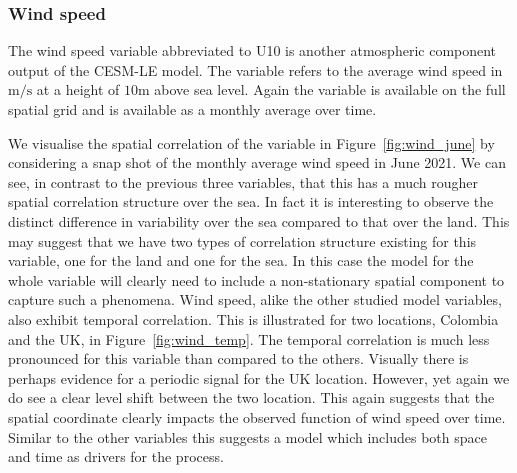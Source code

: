 \subsubsection{Wind speed \label{sssec:wind}}
The wind speed variable  abbreviated to U10 is another atmospheric component output of the CESM-LE model.
The variable refers to the average wind speed in $\si{\meter\per\second}$ at a height of $10\si{\meter}$ above sea level.
Again the variable is available on the full spatial grid and is available as a monthly average over time.

We visualise the spatial correlation of the variable in Figure~\ref{fig:wind_june} by considering a snap shot of the monthly average wind speed in June 2021.
We can see, in contrast to the previous three variables, that this has a much rougher spatial correlation structure over the sea. 
In fact it is interesting to observe the distinct difference in variability over the sea compared to that over the land. 
This may suggest that we have two types of correlation structure existing for this variable, one for the land and one for the sea. 
In this case the model for the whole variable will clearly need to include a non-stationary spatial component to capture such a phenomena.
Wind speed, alike the other studied model variables, also exhibit temporal correlation. 
This is illustrated for two locations, Colombia and the UK, in Figure~\ref{fig:wind_temp}. 
The temporal correlation is much less pronounced for this variable than compared to the others. 
Visually there is perhaps evidence for a periodic signal for the UK location. 
However, yet again we do see a clear level shift between the two location. 
This again suggests that the spatial coordinate clearly impacts the observed function of wind speed over time.
Similar to the other variables this suggests a model which includes both space and time as drivers for the process.


